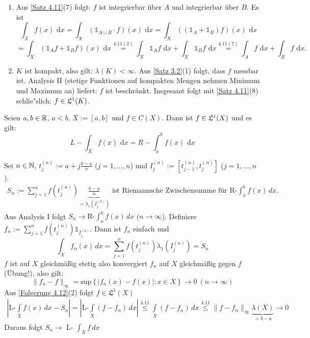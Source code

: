 \documentclass[a4paper,twoside,DIV15,BCOR12mm,chapterprefix=true,headings=onelinechapter]{scrbook}
\begin{document}
\begin{beweis}
\begin{enumerate}
 \item Aus \ref{Satz 4.11}(7) folgt: $f$ ist integrierbar \"uber $A$ und integrierbar \"uber $B$. Es ist 
\[ \int_X f(x) \text{ d}x = \int_X \left( \mathds{1}_{A\cup B} \cdot f \right)(x) \text{ d}x = \int_X \left( \left( \mathds{1}_A + \mathds{1}_B \right) f\right)(x) \text{ d}x \]
\[= \int_X \left(\mathds{1}_A f + \mathds{1}_B f \right)(x) \text{ d}x \stackrel{4.11(2)}{=} \int_X \mathds{1}_A f \text{ d}x + \int_X \mathds{1}_B f \text{ d}x \stackrel{4.11(7)}{=} \int_A f \text{ d}x + \int_B f \text{ d}x.\]

 \item $K$ ist kompakt, also gilt: $\lambda(K) < \infty$. Aus \ref{Satz 3.2}(1) folgt, dass $f$ messbar ist. Analysis II (\glqq stetige Funktionen auf kompakten Mengen nehmen Minimum und Maximum an\grqq ) liefert: $f$ ist beschr\"ankt. Insgesamt folgt mit \ref{Satz 4.11}(8) schlie"slich: $f \in \mathfrak{L}^1(K)$.
\end{enumerate}
\end{beweis}

\begin{satz}
\label{Satz 4.13}
Seien $a,b\in\mathbb{R}$, $a<b$, $X:=[a,b]$ und $f\in C(X)$. Dann ist $f\in\mathfrak{L}^1(X)$ und es gilt:
\[L-\int_X f(x) \text{ d}x=R-\int_a^b f(x) \text{ d}x\]
\end{satz}

\begin{beweis}
Sei $n\in\mathbb{N}$, $t_j^{(n)}:=a+j\frac{b-a}{n}$ ($j=1,\dots,n$) und $I_j^{(n)}:=\left[t_{j-1}^{(n)},t_j^{(n)}\right]$ ($j=1,\dots,n$).
\begin{align*}
S_n:=\sum^n_{j=1} f \left(t_j^{(n)}\right) \underbrace{ \frac{b-a}{n}}_{= \lambda_1 \left(I_j^{(n)}\right)} \text{ ist Riemannsche Zwischensumme für R-} \int_a^bf(x)\,dx.
\end{align*}
Aus Analysis I folgt $S_n\to\text{R-}\int_a^bf(x)\,dx$ ($n\to\infty$). 
Definiere $f_n:=\sum^n_{j=1}f \left(t_j^{(n)} \right) \mathds{1}_{I_j^{(n)}} $. Dann ist $f_n$ einfach und 
\[\int_X f_n(x)\,dx=\sum_{j=1}^n f \left(t_j^{(n)} \right) \lambda_1 \left(I_j^{(n)}\right)=S_n\]
$f$ ist auf $X$ gleichmäßig stetig also konvergiert $f_n$ auf $X$ gleichmäßig gegen $f$ (Übung!), also gilt:
\[\lVert f_n-f \rVert_{\infty}=\text{sup} \left \{ \lvert f_n(x)-f(x) \rvert : x\in X \right\} \to 0 \  (n\to \infty)\]
Aus \ref{Folgerung 4.12}(2) folgt $f\in \mathfrak{L}^1(X)$
\begin{align*}
\left\lvert \text{L-} \int \limits_X f(x)\,dx -S_n \right\rvert = \left\lvert \text{L-} \int \limits_X (f-f_n)\,dx \right\rvert \stackrel{\text{4.11}}\leq \int \limits_X(f-f_n)\,dx \stackrel{\text{4.11}}\leq \lVert f-f_n \rVert_{\infty} \underbrace{\lambda(X)}_{=b-a} \to 0
\end{align*}
Daraus folgt $S_n \to$ L- $\int_X f\,dx$
\end{beweis}
\end{document}
